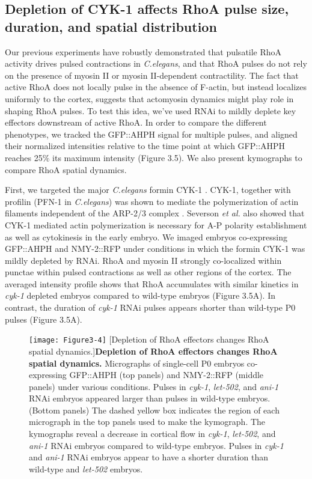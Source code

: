 \documentclass{ucetd}
\begin{document}
\subsection{Depletion of CYK-1 affects RhoA pulse size, duration, and spatial distribution}

Our previous experiments have robustly demonstrated that pulsatile RhoA activity drives pulsed contractions in \textit{C.elegans}, and that RhoA pulses do not rely on the presence of myosin II or myosin II-dependent contractility.  The fact that active RhoA does not locally pulse in the absence of F-actin, but instead localizes uniformly to the cortex, suggests that actomyosin dynamics might play role in shaping RhoA pulses.  To test this idea, we've used RNAi to mildly deplete key effectors downstream of active RhoA.  In order to compare the different phenotypes, we tracked the GFP::AHPH signal for multiple pulses, and aligned their normalized intensities relative to the time point at which GFP::AHPH reaches 25$\%$ its maximum intensity (Figure 3.5).  We also present kymographs to compare RhoA spatial dynamics.


First, we targeted the major \textit{C.elegans} formin CYK-1 \cite{Swan:1998tv}.  CYK-1, together with profilin (PFN-1 in \textit{C.elegans}) was shown to mediate the polymerization of actin filaments independent of the ARP-2/3 complex \cite{Severson:2002ve}.  Severson \textit{et al.} also showed that CYK-1 mediated actin polymerization is necessary for A-P polarity establishment as well as cytokinesis in the early embryo.  We imaged embryos co-expressing GFP::AHPH and NMY-2::RFP under conditions in which the formin CYK-1 was mildly depleted by RNAi.  RhoA and myosin II strongly co-localized within punctae within pulsed contractions as well as other regions of the cortex.  The averaged intensity profile shows that RhoA accumulates with similar kinetics in \textit{cyk-1} depleted embryos compared to wild-type embryos (Figure 3.5A).  In contrast, the duration of \textit{cyk-1} RNAi pulses appears shorter than wild-type P0 pulses (Figure 3.5A).
\begin{figure}[!htbp]
\centering
\texttt{[image: Figure3-4]}
[Depletion of RhoA effectors changes RhoA spatial dynamics.]{\textbf{Depletion of RhoA effectors changes RhoA spatial dynamics.} Micrographs of single-cell P0 embryos co-expressing GFP::AHPH (top panels) and NMY-2::RFP (middle panels) under various conditions.  Pulses in \textit{cyk-1}, \textit{let-502}, and \textit{ani-1} RNAi embryos appeared larger than pulses in wild-type embryos.  (Bottom panels) The dashed yellow box indicates the region of each micrograph in the top panels used to make the kymograph.  The kymographs reveal a decrease in cortical flow in \textit{cyk-1}, \textit{let-502}, and \textit{ani-1} RNAi embryos compared to wild-type embryos.  Pulses in \textit{cyk-1} and \textit{ani-1} RNAi embryos appear to have a shorter duration than wild-type and \textit{let-502} embryos.}
\end{figure}
\end{document}

